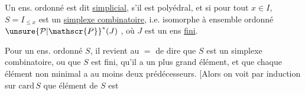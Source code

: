 Un ens. ordonné  est dit \uline{simplicial}, s'il est polyédral, et si pour tout $x\in I$, $S=I_{\leq x}$ est un \uline{simplexe combinatoire}, i.e. isomorphe à  ensemble ordonné ${\unsure{\mathcal{P}|\mathscr{P}}}^*(J)$ , où $J$ est un ens \uline{fini}.

Pour un ens. ordonné $S$, il revient au $=$ de dire que $S$ est un simplexe combinatoire, ou que $S$ est  fini, qu'il a un plus grand élément, et que chaque élément non minimal a au moins deux prédécesseurs. [Alors on voit par induction sur $\mathrm{card}\,S$ que  élément de $S$ est
